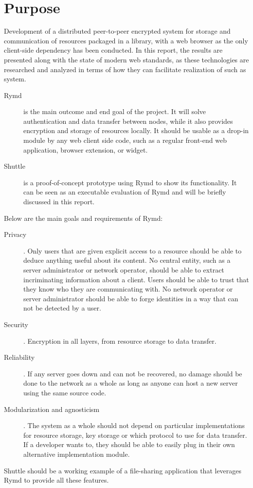 \section{Purpose}\label{sec:purpose}


Development of a distributed peer-to-peer encrypted system for storage and communication of resources packaged in a library, with a web browser as the only client-side dependency has been conducted. In this report, the results are presented along with the state of modern web standards, as these technologies are researched and analyzed in terms of how they can facilitate realization of such as system.

\begin{description}
\item[Rymd] is the main outcome and end goal of the project. It will solve authentication and data transfer between nodes, while it also provides encryption and storage of resources locally. It should be usable as a drop-in module by any web client side code, such as a regular front-end web application, browser extension, or widget.
\item[Shuttle] is a proof-of-concept prototype using Rymd to show its functionality. It can be seen as an executable evaluation of Rymd and will be briefly discussed in this report.
\end{description}

Below are the main goals and requirements of Rymd:

\begin{description}
  \item[Privacy]. Only users that are given explicit access to a resource should be able to deduce anything useful about its content. No central entity, such as a server administrator or network operator, should be able to extract incriminating information about a client. Users should be able to trust that they know who they are communicating with. No network operator or server administrator should be able to forge identities in a way that can not be detected by a user.

\item[Security]. Encryption in all layers, from resource storage to data transfer.

\item[Reliability]. If any server goes down and can not be recovered, no damage should be done to the network as a whole as long as anyone can host a new server using the same source code.

\item[Modularization and agnosticism]. The system as a whole should not depend on particular implementations for resource storage, key storage or which protocol to use for data transfer. If a developer wants to, they should be able to easily plug in their own alternative implementation module.

\end{description}

Shuttle should be a working example of a file-sharing application that leverages Rymd to provide all these features.
